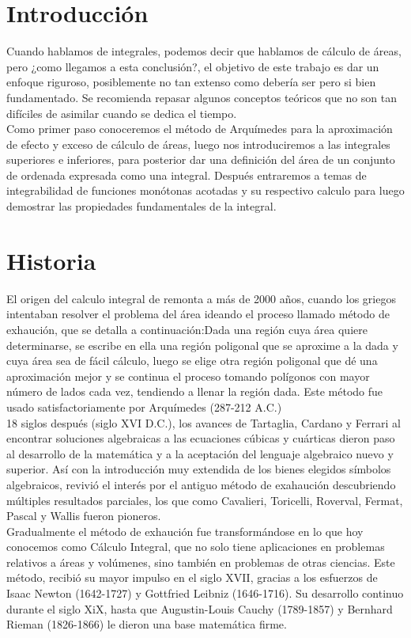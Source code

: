 \begin{multicols}{2}
\section*{Introducción}
Cuando hablamos de integrales, podemos decir que hablamos de cálculo de áreas, pero ¿como llegamos a esta conclusión?, el objetivo de este trabajo es dar un enfoque riguroso, posiblemente no tan extenso como debería ser pero si bien fundamentado. Se recomienda repasar algunos conceptos teóricos que no son tan difíciles de asimilar cuando se dedica el tiempo. \\

Como primer paso conoceremos el método de Arquímedes para la aproximación de efecto y exceso de cálculo de áreas, luego nos introduciremos a las integrales superiores e inferiores, para posterior dar una definición del área de un conjunto de ordenada expresada como una integral. Después entraremos a temas de integrabilidad de funciones monótonas acotadas y su respectivo calculo para luego demostrar las propiedades fundamentales de la integral.

\section*{Historia}
El origen del calculo integral de remonta a más de 2000 años, cuando los griegos intentaban resolver el problema del área ideando el proceso llamado método de exhaución, que se detalla a continuación:Dada una región cuya área quiere determinarse, se escribe en ella una región poligonal que se aproxime a la dada y cuya área sea de fácil cálculo, luego se elige otra región poligonal que dé una aproximación mejor y se continua el proceso tomando polígonos con mayor número de lados cada vez, tendiendo a llenar la región dada. Este método fue usado satisfactoriamente por Arquímedes (287-212 A.C.)\\
18 siglos después (siglo XVI D.C.), los avances de Tartaglia, Cardano y Ferrari al encontrar soluciones algebraicas a las ecuaciones cúbicas y cuárticas dieron paso al desarrollo de la matemática y a la aceptación del lenguaje algebraico nuevo y superior. Así con la introducción muy extendida de los bienes elegidos símbolos algebraicos, revivió el interés por el antiguo método de exahaución descubriendo múltiples resultados parciales, los que como Cavalieri, Toricelli, Roverval, Fermat, Pascal y Wallis fueron pioneros.\\
Gradualmente el método de exhaución fue transformándose en lo que hoy conocemos como Cálculo Integral, que no solo tiene aplicaciones en problemas relativos a áreas y volúmenes, sino también en problemas de otras ciencias. Este método, recibió su mayor impulso en el siglo XVII, gracias a los esfuerzos de Isaac Newton (1642-1727) y Gottfried Leibniz (1646-1716). Su desarrollo continuo durante el siglo XiX, hasta que Augustin-Louis Cauchy (1789-1857) y Bernhard Rieman (1826-1866) le dieron una base matemática firme.


\end{multicols}
